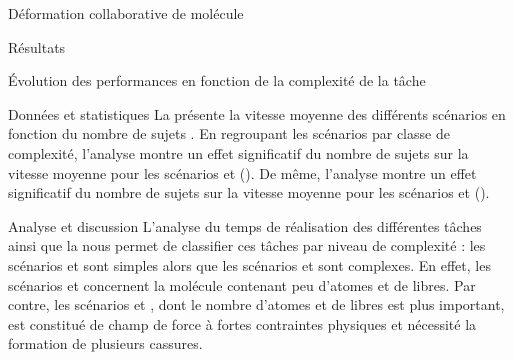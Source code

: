 \documentclass[myfrancais,ngerman,english,frenchb]{mythesis}
\begin{document}
\begin{mychapter}{Déformation collaborative de molécule}
\begin{mysection}{Résultats}
\begin{mysubsection}{Évolution des performances en fonction de la complexité de la tâche}
\begin{mysubsubsection}{Données et statistiques}
					La  présente la vitesse moyenne  des différents scénarios  en fonction du nombre de sujets .
					En regroupant les scénarios par classe de complexité, l'analyse montre un effet significatif du nombre de sujets  sur la vitesse moyenne  pour les scénarios  et  ().
					De même, l'analyse montre un effet significatif du nombre de sujets  sur la vitesse moyenne  pour les scénarios  et  ().
				\end{mysubsubsection}
				\begin{mysubsubsection}{Analyse et discussion}
					L'analyse du temps de réalisation des différentes tâches ainsi que la  nous permet de classifier ces tâches par niveau de complexité : les scénarios  et  sont simples alors que les scénarios  et  sont complexes.
					En effet, les scénarios  et  concernent la molécule \myTRPZIPPER contenant peu d'atomes et de  libres.
					Par contre, les scénarios  et , dont le nombre d'atomes et de  libres est plus important, est constitué de champ de force à fortes contraintes physiques et nécessité la formation de plusieurs cassures.


\end{mysubsubsection}
\end{mysubsection}
\end{mysection}
\end{mychapter}
\end{document}
